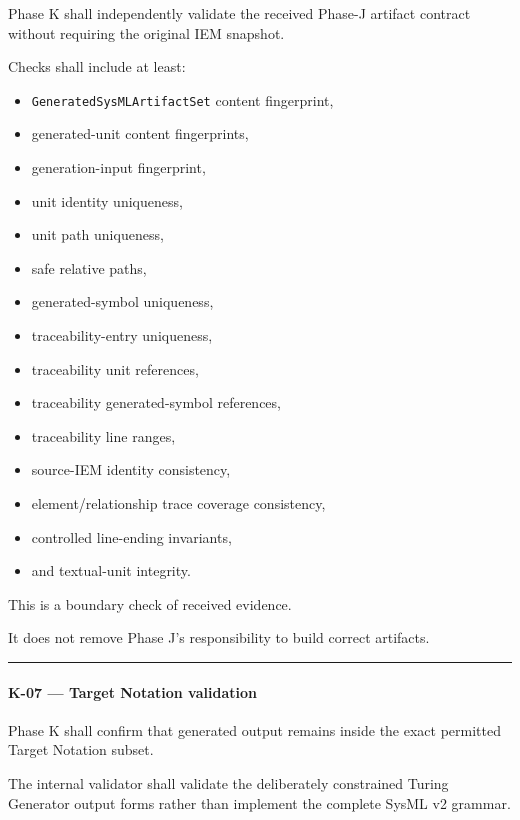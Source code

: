 Phase K shall independently validate the received Phase-J artifact contract without requiring the original IEM snapshot.

Checks shall include at least:

\begin{itemize}
\tightlist
\item
  \texttt{GeneratedSysMLArtifactSet} content fingerprint,
\item
  generated-unit content fingerprints,
\item
  generation-input fingerprint,
\item
  unit identity uniqueness,
\item
  unit path uniqueness,
\item
  safe relative paths,
\item
  generated-symbol uniqueness,
\item
  traceability-entry uniqueness,
\item
  traceability unit references,
\item
  traceability generated-symbol references,
\item
  traceability line ranges,
\item
  source-IEM identity consistency,
\item
  element/relationship trace coverage consistency,
\item
  controlled line-ending invariants,
\item
  and textual-unit integrity.
\end{itemize}

This is a boundary check of received evidence.

It does not remove Phase J's responsibility to build correct artifacts.

\begin{center}\rule{0.5\linewidth}{0.5pt}\end{center}

\hypertarget{k-07--target-notation-validation}{%
\paragraph{K-07 --- Target Notation validation}\label{k-07--target-notation-validation}}

Phase K shall confirm that generated output remains inside the exact permitted Target Notation subset.

The internal validator shall validate the deliberately constrained Turing Generator output forms rather than implement the complete SysML v2 grammar.

